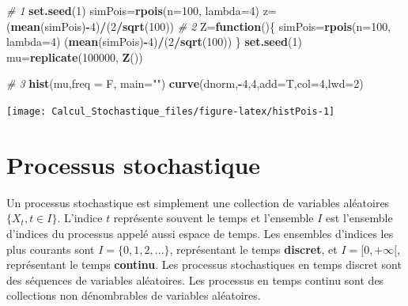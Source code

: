 \documentclass[
]{book}
\newenvironment{Shaded}{\begin{snugshade}}{\end{snugshade}}
\newcommand{\CommentTok}[1]{\textcolor[rgb]{0.56,0.35,0.01}{\textit{#1}}}
\newcommand{\ControlFlowTok}[1]{\textcolor[rgb]{0.13,0.29,0.53}{\textbf{#1}}}
\newcommand{\DataTypeTok}[1]{\textcolor[rgb]{0.13,0.29,0.53}{#1}}
\newcommand{\DecValTok}[1]{\textcolor[rgb]{0.00,0.00,0.81}{#1}}
\newcommand{\KeywordTok}[1]{\textcolor[rgb]{0.13,0.29,0.53}{\textbf{#1}}}
\newcommand{\NormalTok}[1]{#1}
\newcommand{\OperatorTok}[1]{\textcolor[rgb]{0.81,0.36,0.00}{\textbf{#1}}}
\newcommand{\StringTok}[1]{\textcolor[rgb]{0.31,0.60,0.02}{#1}}
\theoremstyle{definition}
\theoremstyle{definition}
\theoremstyle{definition}
\theoremstyle{remark}
\begin{document}
\begin{Shaded}
\begin{Highlighting}[]
\CommentTok{# 1}
\KeywordTok{set.seed}\NormalTok{(}\DecValTok{1}\NormalTok{)}
\NormalTok{simPois=}\KeywordTok{rpois}\NormalTok{(}\DataTypeTok{n=}\DecValTok{100}\NormalTok{, }\DataTypeTok{lambda=}\DecValTok{4}\NormalTok{)}
\NormalTok{z=(}\KeywordTok{mean}\NormalTok{(simPois)}\OperatorTok{-}\DecValTok{4}\NormalTok{)}\OperatorTok{/}\NormalTok{(}\DecValTok{2}\OperatorTok{/}\KeywordTok{sqrt}\NormalTok{(}\DecValTok{100}\NormalTok{))}
\CommentTok{# 2}
\NormalTok{Z=}\ControlFlowTok{function}\NormalTok{()\{}
\NormalTok{ simPois=}\KeywordTok{rpois}\NormalTok{(}\DataTypeTok{n=}\DecValTok{100}\NormalTok{, }\DataTypeTok{lambda=}\DecValTok{4}\NormalTok{)}
\NormalTok{(}\KeywordTok{mean}\NormalTok{(simPois)}\OperatorTok{-}\DecValTok{4}\NormalTok{)}\OperatorTok{/}\NormalTok{(}\DecValTok{2}\OperatorTok{/}\KeywordTok{sqrt}\NormalTok{(}\DecValTok{100}\NormalTok{)) }
\NormalTok{\}}
\KeywordTok{set.seed}\NormalTok{(}\DecValTok{1}\NormalTok{)}
\NormalTok{mu=}\KeywordTok{replicate}\NormalTok{(}\DecValTok{100000}\NormalTok{, }\KeywordTok{Z}\NormalTok{())}
\end{Highlighting}
\end{Shaded}

\begin{Shaded}
\begin{Highlighting}[]
\CommentTok{# 3}
\KeywordTok{hist}\NormalTok{(mu,}\DataTypeTok{freq =}\NormalTok{ F, }\DataTypeTok{main=}\StringTok{""}\NormalTok{)}
\KeywordTok{curve}\NormalTok{(dnorm,}\OperatorTok{-}\DecValTok{4}\NormalTok{,}\DecValTok{4}\NormalTok{,}\DataTypeTok{add=}\NormalTok{T,}\DataTypeTok{col=}\DecValTok{4}\NormalTok{,}\DataTypeTok{lwd=}\DecValTok{2}\NormalTok{)}
\end{Highlighting}
\end{Shaded}

\begin{center}\texttt{[image: Calcul\_Stochastique\_files/figure-latex/histPois-1]} \end{center}

\hypertarget{processus-stochastique}{%
\section{Processus stochastique}\label{processus-stochastique}}

Un processus stochastique est simplement une collection de variables aléatoires \(\{X_t, t \in I\}\). L'indice \(t\) représente souvent le temps et l'ensemble \(I\) est l'ensemble d'indices du processus appelé aussi espace de temps. Les ensembles d'indices les plus courants sont \(I = \{0, 1, 2,\ldots\}\), représentant le temps \textbf{discret}, et \(I = [0, +\infty[\), représentant le temps \textbf{continu}. Les processus stochastiques en temps discret sont des séquences de variables aléatoires. Les processus en temps continu sont des collections non dénombrables de variables aléatoires.
\end{document}
